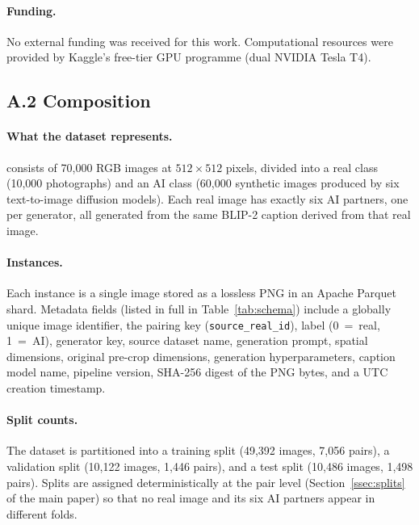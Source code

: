 \paragraph{Funding.}
No external funding was received for this work.
Computational resources were provided by Kaggle's free-tier GPU
programme (dual NVIDIA Tesla T4).

\subsection*{A.2 \quad Composition}
\label{ssec:ds_composition}

\paragraph{What the dataset represents.}
\textbf{\datasetname} consists of 70,000 RGB images at $512 \times 512$
pixels, divided into a real class (10,000 photographs) and an AI
class (60,000 synthetic images produced by six text-to-image diffusion
models).
Each real image has exactly six AI partners, one per generator,
all generated from the same BLIP-2 caption derived from that real
image.

\paragraph{Instances.}
Each instance is a single image stored as a lossless PNG in an Apache
Parquet shard.
Metadata fields (listed in full in Table~\ref{tab:schema}) include a
globally unique image identifier, the pairing key
(\texttt{source\_real\_id}), label (0~=~real, 1~=~AI), generator key,
source dataset name, generation prompt, spatial dimensions, original
pre-crop dimensions, generation hyperparameters, caption model name,
pipeline version, SHA-256 digest of the PNG bytes, and a UTC creation
timestamp.

\paragraph{Split counts.}
The dataset is partitioned into a training split (49,392 images,
7,056 pairs), a validation split (10,122 images, 1,446 pairs), and a
test split (10,486 images, 1,498 pairs).
Splits are assigned deterministically at the pair level
(Section~\ref{ssec:splits} of the main paper) so that no real image and its six AI
partners appear in different folds.

